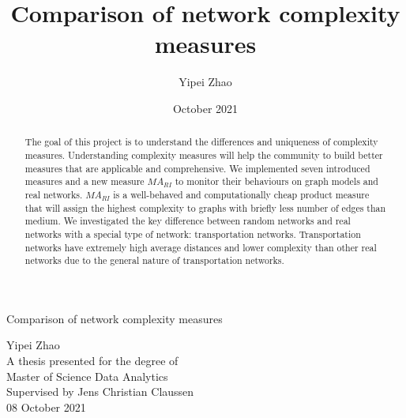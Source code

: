 \documentclass[12pt]{article}
\title{Comparison of network complexity measures}
\author{Yipei Zhao}
\date{October 2021}
\begin{document}
\begin{titlepage}
    \begin{center}
        \vspace*{1cm}
 
        {\Huge Comparison of network complexity measures}
 
        \vspace{0.5cm}
         
             
        \vspace{1.5cm}

        \centering
        \Large{Yipei Zhao}\\
        \vspace{25mm}
        A thesis presented for the degree of\\
        Master of Science Data Analytics\\
        Supervised by Jens Christian Claussen\\
        08 October 2021
 
        \vfill
             

    \end{center}
 \end{titlepage}
\begin{abstract}
    The goal of this project is to understand the differences and uniqueness of complexity measures. Understanding complexity measures will help the community to build better measures that are applicable and comprehensive. We implemented seven introduced measures and a new measure $MA_{RI}$ to monitor their behaviours on graph models and real networks. $MA_{RI}$ is a well-behaved and computationally cheap product measure that will assign the highest complexity to graphs with briefly less number of edges than medium. We investigated the key difference between random networks and real networks with a special type of network: transportation networks. Transportation networks have extremely high average distances and lower complexity than other real networks due to the general nature of transportation networks.
\end{abstract}
\tableofcontents
\pagebreak
\renewcommand{\familydefault}{}
\end{document}
